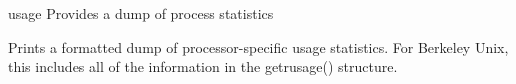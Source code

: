 \begin{nusmvCommand}{usage} {Provides a dump of process statistics}
 

Prints a formatted dump of processor-specific usage statistics. For
Berkeley Unix, this includes all of the information in the getrusage()
structure.

\end{nusmvCommand}
